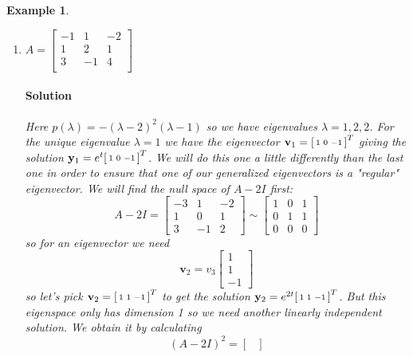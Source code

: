\documentclass[letterpaper, 11pt, openany]{book}
\theoremstyle{mytheoremstyle}
\theoremstyle{myexamplestyle}
\newtheorem{example}{Example}[section]
\newenvironment{solution}{\paragraph{\sffamily \smaller \fontseries{b}\selectfont Solution}}{\hfill\faSquare}
\begin{document}
\begin{example}
\begin{enumerate}
        \item \(A = \begin{bmatrix}
            -1 & 1 & -2 \\
            1 & 2 & 1 \\
            3 & -1 & 4 \\
        \end{bmatrix}\)
        \begin{solution}
            Here \(p(\lambda) = -(\lambda -2)^2 (\lambda -1)\) so we have eigenvalues \(\lambda = 1, 2, 2\). For the unique eigenvalue \(\lambda = 1\) we have the eigenvector \(\mathbf{v}_1 = \begin{bsmallmatrix}1 & 0 & -1\end{bsmallmatrix}^{T}\) giving the solution \(\mathbf{y}_1 = e^t \begin{bsmallmatrix}1 & 0 & -1\end{bsmallmatrix}^{T}\).
            We will do this one a little differently than the last one in order to ensure that one of our generalized eigenvectors is a "regular" eigenvector. We will find the null space of \(A - 2I\) first:
            \[A - 2I = 
            \begin{bmatrix}
                -3 & 1 & -2\\
                1 & 0 & 1\\
                3 & -1 & 2
             \end{bmatrix}
             \sim
             \begin{bmatrix}
                1 & 0 & 1\\
                0 & 1 & 1\\
                0 & 0 & 0
             \end{bmatrix}\]
             so for an eigenvector we need
             \[\mathbf{v}_2 = v_3 \begin{bmatrix}
                1 \\ 1 \\ -1
             \end{bmatrix}\] so let's pick \(\mathbf{v}_2 =\begin{bsmallmatrix}1 & 1 & -1\end{bsmallmatrix}^{T}\) to get the solution \(\mathbf{y}_2 = e^{2t} \begin{bsmallmatrix}1 & 1 & -1\end{bsmallmatrix}^{T}\). But this eigenspace only has dimension 1 so we need another linearly independent solution. We obtain it by calculating
             \[(A - 2I)^2 = \begin{bmatrix}

\end{bmatrix}\]
\end{solution}
\end{enumerate}
\end{example}
\end{document}
